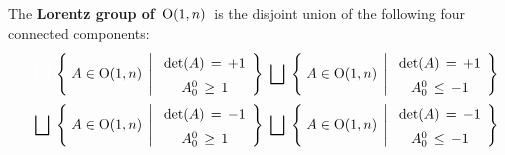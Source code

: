 \vskip 0.5cm
\begin{corollary}
\mbox{}
\vskip 0.1cm
\noindent
The \textbf{Lorentz group of \,$\textnormal{O}(1,n)$}\, is the disjoint union of the following four connected components:
\begin{eqnarray*}
&&
{\color{white}\bigsqcup}\;
\left\{\;
	A \overset{{\color{white}.}}{\in} \textnormal{O}(1,n)
	\;\left\vert\;
		\begin{array}{ccc}
		\textnormal{det}(A) \,\overset{{\color{white}1}}{=}\, +1
		\\
		A^{0}_{0} \,\overset{{\color{white}1}}{\geq}\, 1
		\end{array}
		\right.
	\!\right\}
\;\bigsqcup\;
\left\{\;
	A \overset{{\color{white}.}}{\in} \textnormal{O}(1,n)
	\;\left\vert\;
		\begin{array}{ccc}
		\textnormal{det}(A) \,\overset{{\color{white}1}}{=}\, +1
		\\
		A^{0}_{0} \,\overset{{\color{white}1}}{\leq}\, -1
		\end{array}
		\right.
	\!\right\}
\\
&&
\bigsqcup\;
\left\{\;
	A \overset{{\color{white}.}}{\in} \textnormal{O}(1,n)
	\;\left\vert\;
		\begin{array}{ccc}
		\textnormal{det}(A) \,\overset{{\color{white}1}}{=}\, -1
		\\
		A^{0}_{0} \,\overset{{\color{white}1}}{\geq}\, 1
		\end{array}
		\right.
	\!\right\}
\;\bigsqcup\;
\left\{\;
	A \overset{{\color{white}.}}{\in} \textnormal{O}(1,n)
	\;\left\vert\;
		\begin{array}{ccc}
		\textnormal{det}(A) \,\overset{{\color{white}1}}{=}\, -1
		\\
		A^{0}_{0} \,\overset{{\color{white}1}}{\leq}\, -1
		\end{array}
		\right.
	\!\right\}
\end{eqnarray*}
\end{corollary}


